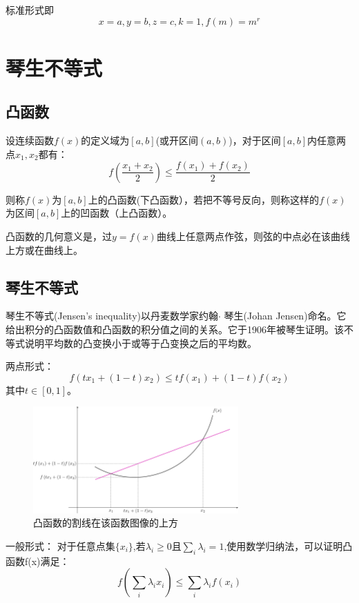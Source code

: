 \documentclass[a4paper]{article} %
\numberwithin{equation}{section} %
\begin{document}
标准形式即
\begin{equation}
x=a,y=b,z=c,k=1,f(m)=m^r
\end{equation}

\section{琴生不等式}

\subsection{凸函数}
设连续函数$f(x)$的定义域为$[a,b]$(或开区间$(a,b)$)，对于区间$[a,b]$内任意两点$x_1,x_2$都有：
\begin{equation}
f(\frac{x_1+x_2}{2}) \le \frac{f(x_1)+f(x_2)}{2} 
\end{equation}

则称$f(x)$为$[a,b]$上的凸函数(下凸函数），若把不等号反向，则称这样的$f(x)$为区间$[a,b]$上的凹函数（上凸函数）。

凸函数的几何意义是，过$y=f(x)$曲线上任意两点作弦，则弦的中点必在该曲线上方或在曲线上。

\subsection{琴生不等式}
琴生不等式(Jensen's inequality)以丹麦数学家约翰$\cdot$ 琴生(Johan Jensen)命名。它给出积分的凸函数值和凸函数的积分值之间的关系。它于1906年被琴生证明。该不等式说明平均数的凸变换小于或等于凸变换之后的平均数。


两点形式：
\begin{equation*}
f(tx_1+(1-t)x_2)\le tf(x_1)+(1-t)f(x_2) \label{eq:twopoint}
\end{equation*}
其中$t\in[0,1]$。

\begin{figure}[H]
\centering
\includegraphics[width=0.7\textwidth]{convex.png}
\caption{凸函数的割线在该函数图像的上方}
\end{figure}

一般形式：
对于任意点集$\{x_i\}$,若$\lambda_i\ge 0$且$\sum_i\lambda_i=1$,使用数学归纳法，可以证明凸函数f(x)满足：
\begin{equation}
f(\sum_i\lambda_ix_i)\le \sum_i\lambda_i f(x_i) \label{eq:jensen}
\end{equation}
\end{document}
